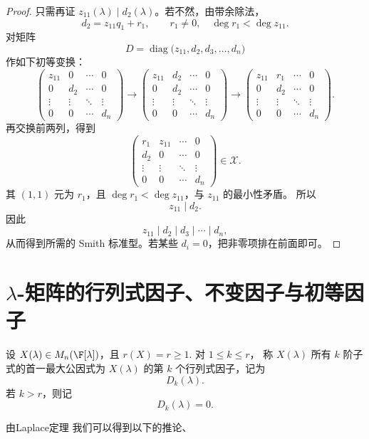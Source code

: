 \begin{proof}
	只需再证 $z_{11}(\lambda)\mid d_2(\lambda)$。若不然，由带余除法，
	\[
	d_2=z_{11}q_1+r_1,\qquad r_1\neq0,\quad \deg r_1<\deg z_{11}.
	\]
	对矩阵
	\[
	D=\operatorname{diag}\bigl(z_{11},d_2,d_3,\ldots,d_n\bigr)
	\]
	作如下初等变换：
	\[
	\begin{pmatrix}
		z_{11} & 0 & \cdots & 0\\
		0 & d_2 & \cdots & 0\\
		\vdots & \vdots & \ddots & \vdots\\
		0 & 0 & \cdots & d_n
	\end{pmatrix}
	\longrightarrow
	\begin{pmatrix}
		z_{11} & d_2 & \cdots & 0\\
		0 & d_2 & \cdots & 0\\
		\vdots & \vdots & \ddots & \vdots\\
		0 & 0 & \cdots & d_n
	\end{pmatrix}
	\longrightarrow
	\begin{pmatrix}
		z_{11} & r_1 & \cdots & 0\\
		0 & d_2 & \cdots & 0\\
		\vdots & \vdots & \ddots & \vdots\\
		0 & 0 & \cdots & d_n
	\end{pmatrix}.
	\]
	再交换前两列，得到
	\[
	\begin{pmatrix}
		r_1 & z_{11} & \cdots & 0\\
		d_2 & 0 & \cdots & 0\\
		\vdots & \vdots & \ddots & \vdots\\
		0 & 0 & \cdots & d_n
	\end{pmatrix}\in\mathcal X.
	\]
	其 $(1,1)$ 元为 $r_1$，且 $\deg r_1<\deg z_{11}$，与 $z_{11}$ 的最小性矛盾。
	所以
	\[
	z_{11}\mid d_2.
	\]
	因此
	\[
	z_{11}\mid d_2\mid d_3\mid\cdots\mid d_n,
	\]
	从而得到所需的 Smith 标准型。若某些 $d_i=0$，把非零项排在前面即可。
\end{proof}
\section{$\lambda$-矩阵的行列式因子、不变因子与初等因子}


\begin{definition}
	
设 $X(\lambda)\in M_n(\F[\lambda])$，且 $r(X)=r\geq 1$. 对 $1\leq k\leq r$，
称 $X(\lambda)$ 所有 $k$ 阶子式的首一最大公因式为 $X(\lambda)$ 的第 $k$ 个行列式因子，记为
\[
D_k(\lambda).
\]
若 $k>r$，则记
\[
D_k(\lambda)=0.
\]

\end{definition}
由Laplace定理 我们可以得到以下的推论、


